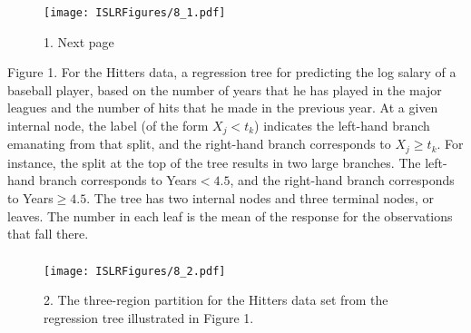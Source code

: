 \documentclass{beamer}
\begin{document}
  
         
            
        
         
           
           \begin{frame}
           	\frametitle{ }
           	\begin{figure}
           		\centering
           			\texttt{[image: ISLRFigures/8\_1.pdf]}
           		\caption{1. Next page
           		}
           	\end{figure}
           \end{frame}
           
              
              \begin{frame}
              
              		  Figure 1. For the Hitters data, a regression tree for predicting the log
              		 	salary of a baseball player, based on the number of years that he has played in
              		 	the major leagues and the number of hits that he made in the previous year. At a
              		 	given internal node, the label (of the form $X_j < t_k$) indicates the left-hand branch
              		 	emanating from that split, and the right-hand branch corresponds to $ X_j \geq t_k$.
              		 	For instance, the split at the top of the tree results in two large branches. The
              		 	left-hand branch corresponds to Years$<4.5$, and the right-hand branch corresponds
              		 	to Years$\geq 4.5$. The tree has two internal nodes and three terminal nodes, or
              		 	leaves. The number in each leaf is the mean of the response for the observations
              		 	that fall there.
              		
              \end{frame}
              
               
               \begin{frame}
               	\frametitle{ }
               	\begin{figure}
               		\centering
               		
               		\centering
               		\texttt{[image: ISLRFigures/8\_2.pdf]}
               		\caption{2. The three-region partition for the Hitters data set from the
               			regression tree illustrated in Figure 1.}
               		 
               		 
               	\end{figure}
               \end{frame}
              
\end{document}
